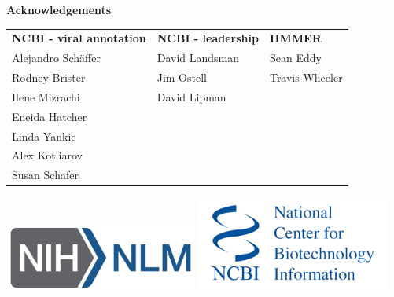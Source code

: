 \documentclass[landscape]{slides}
\begin{document}
\begin{slide}

\large
\begin{center}
\large{\textbf{Acknowledgements}} \\

\normalsize
\vspace{0.75in}

\small
\begin{tabular}{l|l|l}
\textbf{NCBI - viral annotation} & \textbf{NCBI - leadership} &  \textbf{HMMER} \\
Alejandro Sch\"{a}ffer           & David Landsman             & Sean Eddy \\
Rodney Brister                   & Jim Ostell                 & Travis Wheeler \\
Ilene Mizrachi                   & David Lipman               & \\
Eneida Hatcher                   & & \\
Linda Yankie                     & & \\
Alex Kotliarov                   & & \\
Susan Schafer                    & & \\
\end{tabular}

\includegraphics[width=2.5in]{figs/NIH_NLM_ABRV_2C_4-white}
\includegraphics[width=2.5in]{figs/ncbi-logo}

\end{center}

\vfill
\end{slide}
\end{document}
